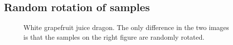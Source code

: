 \subsection{Random rotation of samples}
\begin{figure}
\centering
{} 
\caption{White grapefruit juice dragon. The only difference in the two images is that the samples on the right figure are randomly rotated.}
\label{fig:banding}
\end{figure}

